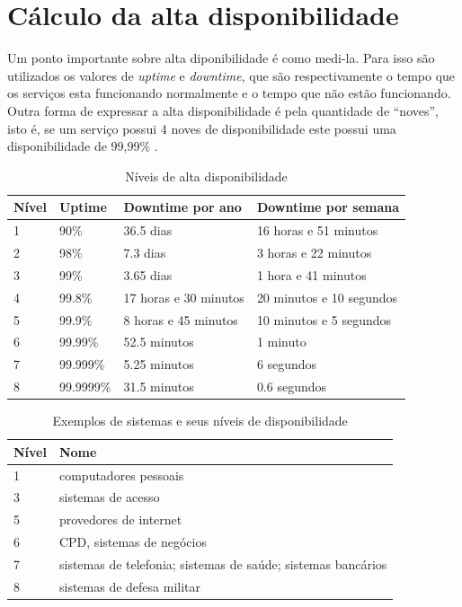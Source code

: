 \section{Cálculo da alta disponibilidade}

Um ponto importante sobre alta diponibilidade é como medi-la. Para isso são utilizados os valores de \textit{uptime} e 
\textit{downtime}, que são respectivamente o tempo que os serviços esta funcionando normalmente e o tempo que não estão funcionando.
Outra forma de expressar a alta disponibilidade é pela quantidade de ``noves'', isto é, se um serviço possui 4 noves de disponibilidade
este possui uma disponibilidade de 99,99\% \cite{pereirafilho2004}.

\begin{table}
\caption {Níveis de alta disponibilidade}
\label{tab:dispniveis} 
\begin{center}
\begin{tabular}{|l|l|l|l|}\hline
Nível & Uptime & Downtime por ano & Downtime por semana\\\hline
1 & 90\% & 36.5 dias & 16 horas e 51 minutos\\\hline
2 & 98\% & 7.3 dias & 3 horas e 22 minutos\\\hline
3 & 99\% & 3.65 dias & 1 hora e 41 minutos\\\hline
4 & 99.8\% & 17 horas e 30 minutos & 20 minutos e 10 segundos\\\hline
5 & 99.9\% & 8 horas e 45 minutos & 10 minutos e 5 segundos\\\hline
6 & 99.99\% & 52.5 minutos & 1 minuto\\\hline
7 & 99.999\% & 5.25 minutos & 6 segundos\\\hline
8 & 99.9999\% & 31.5 minutos & 0.6 segundos\\\hline
\end{tabular}
\end{center}
\end{table}

\begin{table}
\caption {Exemplos de sistemas e seus níveis de disponibilidade}
\label{tab:dispexemplos} 
\begin{center}
\begin{tabular}{|l|l|}\hline
Nível  & Nome\\\hline
1 & computadores pessoais\\\hline
3 & sistemas de acesso\\\hline
5 & provedores de internet\\\hline
6 & CPD, sistemas de negócios\\\hline
7 & sistemas de telefonia; sistemas de saúde; sistemas bancários\\\hline
8 & sistemas de defesa militar\\\hline
\end{tabular}
\end{center}
\end{table}

